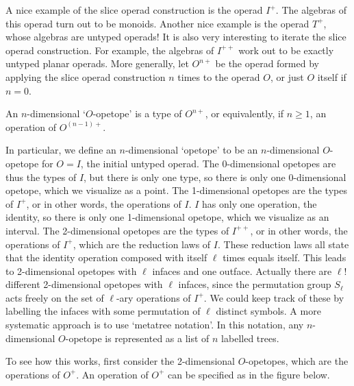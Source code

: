 A nice example of the slice operad construction is the operad $I^+$.
The algebras of this operad turn out to be monoids.  Another nice
example is the operad $T^+$, whose algebras are untyped operads!
It is also very interesting to iterate the slice operad construction.  
For example, the algebras of $I^{++}$ work out to be exactly untyped 
planar operads.  More generally, let $O^{n+}$ be the operad formed 
by applying the slice operad construction $n$ times to the operad $O$, 
or just $O$ itself if $n = 0$.   

\begin{defn}\et An $n$-dimensional `$O$-opetope' is a type of $O^{n+}$,
or equivalently, if $n \ge 1$, an operation of $O^{(n-1)+}$.  \end{defn}

In particular, we define an $n$-dimensional `opetope' to be an
$n$-dimensional $O$-opetope for $O = I$, the initial untyped operad.
The 0-dimensional opetopes are thus the types of $I$, but there is only
one type, so there is only one 0-dimensional opetope, which we visualize
as a point. The 1-dimensional opetopes are the types of $I^+$, or in
other words, the operations of $I$.  $I$ has only one operation, the
identity, so there is only one 1-dimensional opetope, which we visualize
as an interval.  The 2-dimensional opetopes are the types of $I^{++}$,
or in other words, the operations of $I^+$, which are the reduction laws
of $I$.  These reduction laws all state that the identity operation
composed with itself $\ell$ times equals itself.  This leads to
2-dimensional opetopes with $\ell$ infaces and one outface.  Actually
there are $\ell !$ different 2-dimensional opetopes with $\ell$ infaces,
since the permutation group $S_\ell$ acts freely on the set of
$\ell$-ary operations of $I^+$.  We could keep track of these by
labelling the infaces with some permutation of $\ell$ distinct symbols.
A more systematic approach is to use `metatree notation'.  In this notation, 
any $n$-dimensional $O$-opetope is represented as a list of $n$ labelled
trees.  

To see how this works, first consider the 2-dimensional $O$-opetopes, which
are the operations of $O^+$.   An operation of $O^+$ can be specified as
in the figure below.  

